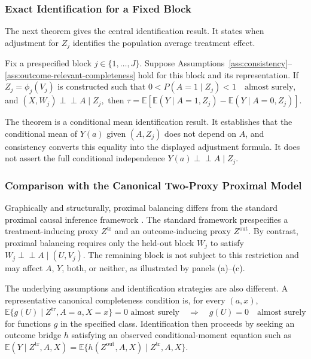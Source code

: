 \subsubsection{Exact Identification for a Fixed Block}
\label{sec:exact-proxy-identification}

The next theorem gives the central identification result. It states when adjustment for $Z_j$ identifies the population average treatment effect.

\begin{theorem} \label{appdetail:thm:exact-proxy-identification}
\normalfont
Fix a prespecified block $j\in\{1,\ldots,J\}$. Suppose Assumptions~\ref{ass:consistency}--\ref{ass:outcome-relevant-completeness} hold for this block and its representation. If $Z_j=\phi_j(V_j)$ is constructed such that
	\(0<P(A=1\mid Z_j)<1 \quad\text{almost surely},\)
and
	\((X,W_j)\perp\!\!\!\perp A\mid Z_j,\)
	then
	\(\tau = \mathbb E\!\left[ \mathbb E(Y\mid A=1,Z_j) - \mathbb E(Y\mid A=0,Z_j) \right].\)
\end{theorem}

The theorem is a conditional mean identification result. It establishes that the conditional mean of $Y(a)$ given $(A,Z_j)$ does not depend on $A$, and consistency converts this equality into the displayed adjustment formula. It does not assert the full conditional independence $Y(a)\perp\!\!\!\perp A\mid Z_j$.

\subsubsection{Comparison with the Canonical Two-Proxy Proximal Model}

Graphically and structurally, proximal balancing differs from the standard proximal causal inference framework \citep{miao2018proxy,tchetgen2024ProximalCausalInference}. The standard framework prespecifies a treatment-inducing proxy $Z^{\mathrm{tr}}$ and an outcome-inducing proxy $Z^{\mathrm{out}}$. By contrast, proximal balancing requires only the held-out block $W_j$ to satisfy $W_j\perp\!\!\!\perp A\mid(U,V_j)$. The remaining block is not subject to this restriction and may affect $A$, $Y$, both, or neither, as illustrated by panels (a)--(c).

The underlying assumptions and identification strategies are also different. A representative canonical completeness condition is, for every $(a,x)$,
\(\mathbb E\{g(U)\mid Z^{\mathrm{tr}},A=a,X=x\}=0\text{ almost surely} \quad\Longrightarrow\quad g(U)=0 \quad\text{almost surely}\)
for functions $g$ in the specified class. Identification then proceeds by seeking an outcome bridge $h$ satisfying an observed conditional-moment equation such as
	\(\mathbb E(Y\mid Z^{\mathrm{tr}},A,X) = \mathbb E\{h(Z^{\mathrm{out}},A,X)\mid Z^{\mathrm{tr}},A,X\}.\)

